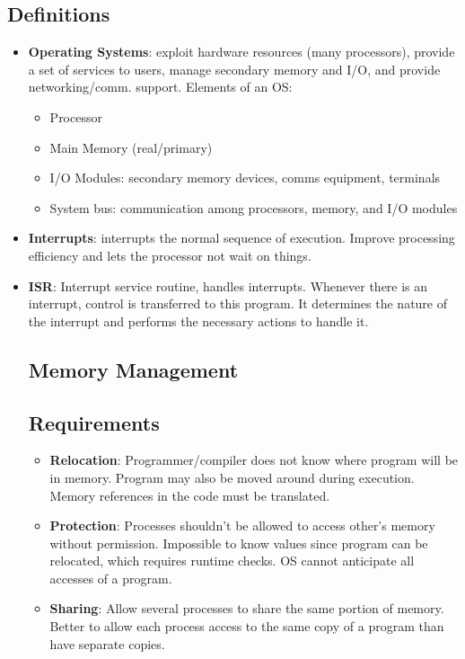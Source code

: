\documentclass[fontsize=5pt]{scrartcl}
\begin{document}
\begin{multicols}{3}
  \section{Definitions}
    \begin{itemize}
      \item \textbf{Operating Systems}: exploit hardware resources (many processors), provide a set of services to users, manage secondary memory and I/O, %
          and provide networking/comm. support. Elements of an OS:
      \begin{itemize}
        \item Processor
        \item Main Memory (real/primary)
        \item I/O Modules: secondary memory devices, comms equipment, terminals
        \item System bus: communication among processors, memory, and I/O modules
       \end{itemize}
       \item \textbf{Interrupts}: interrupts the normal sequence of execution. Improve processing efficiency and lets the processor not wait on things.
       \item \textbf{ISR}: Interrupt service routine, handles interrupts. Whenever  there is an interrupt, control is transferred to this program.  %
                       It determines the nature of the interrupt and performs the necessary actions to handle it.


   \section{Memory Management}
      \subsection{Requirements}
        \begin{itemize}
          \item \textbf{Relocation}: Programmer/compiler does not know where program will be in memory. Program may also be 
                    moved around during execution. Memory references in the code must be translated.
          \item \textbf{Protection}: Processes shouldn't be allowed to access other's memory without permission. Impossible to know
                    values since program can be relocated, which requires runtime checks. OS cannot anticipate all accesses of a program.
          \item \textbf{Sharing}: Allow several processes to share the same portion of memory. Better to allow each
                    process access to the same copy of a program than have separate copies.
        \end{itemize}

\end{itemize}
\end{multicols}
\end{document}

